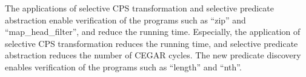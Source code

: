 
The applications of selective CPS transformation and selective predicate
abstraction enable verification of the programs such as ``zip'' and
``map\_head\_filter'', and reduce the running time.  Especially, the
application of selective CPS transformation reduces the running time,
and selective predicate abstraction reduces the number of CEGAR cycles.
The new predicate discovery enables verification of the programs such as
``length'' and ``nth''.

